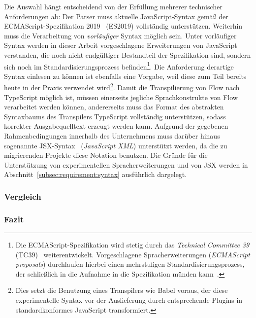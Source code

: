 Die Auswahl hängt entscheidend von der Erfüllung mehrerer technischer Anforderungen ab:
Der Parser muss aktuelle JavaScript-Syntax gemäß der ECMAScript-Spezifikation 2019~\autocite{ECMASCRIPT:2019} (ES2019) vollständig unterstützen.
Weiterhin muss die Verarbeitung von \emph{vorläufiger} Syntax möglich sein. Unter vorläufiger Syntax werden in dieser Arbeit vorgeschlagene Erweiterungen von JavaScript verstanden, die noch nicht endgültiger Bestandteil der Spezifikation sind, sondern sich noch im Standardisierungsprozess befinden\footnote{Die ECMAScript-Spezifikation wird stetig durch das \textit{Technical Committee 39} (TC39)~\autocite{TC39_COMMITTEE} weiterentwickelt. Vorgeschlagene Spracherweiterungen (\textit{ECMAScript proposals}) durchlaufen hierbei einen mehrstufigen Standardisierungsprozess, der schließlich in die Aufnahme in die Spezifikation münden kann~\autocite{TC39_PROCESS}.}. Die Anforderung derartige Syntax einlesen zu können ist ebenfalls eine Vorgabe, weil diese zum Teil bereits heute in der Praxis verwendet wird\footnote{Dies setzt die Benutzung eines Transpilers wie Babel voraus, der diese experimentelle Syntax vor der Auslieferung durch entsprechende Plugins in standardkonformes JavaScript transformiert.}.
Damit die Transpilierung von Flow nach TypeScript möglich ist, müssen einerseits jegliche Sprachkonstrukte von Flow verarbeitet werden können, andererseits muss das Format des abstrakten Syntaxbaums des Transpilers TypeScript vollständig unterstützen, sodass korrekter Ausgabequelltext erzeugt werden kann.
Aufgrund der gegebenen Rahmenbedingungen innerhalb des Unternehmens muss darüber hinaus sogenannte JSX-Syntax~\autocite{SOFTWARE:JSX} (\textit{JavaScript XML}) unterstützt werden, da die zu migrierenden Projekte diese Notation benutzen. Die Gründe für die Unterstützung von experimentellen Spracherweiterungen und von JSX werden in Abschnitt~\ref{subsec:requirement:syntax} ausführlich dargelegt.

\subsubsection{Vergleich}





\subsubsection{Fazit}

